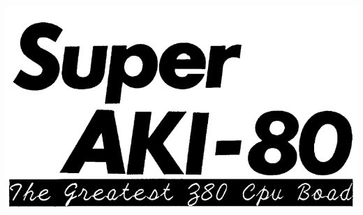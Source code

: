 \documentclass[letterpaper]{article}
\begin{document}
    \begin{center}
        \includegraphics[scale=0.6]{super-aki.png}
    \end{center}
\end{document}
